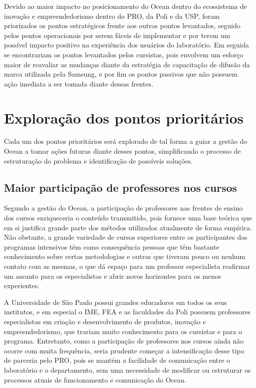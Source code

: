 Devido ao maior impacto no posicionamento do Ocean dentro do ecossistema de inovação e empreendedorismo dentro do PRO, da Poli e da USP, foram priorizados os pontos estratégicos frente aos outros pontos levantados, seguido pelos pontos operacionais por serem fáceis de implementar e por terem um possível impacto positivo na experiência dos usuários do laboratório. Em seguida se encontrariam os pontos levantados pelos cursistas, pois envolvem um esforço maior de reavaliar as mudanças diante da estratégia de capacitação de difusão da marca utilizada pela Samsung, e por fim os pontos passivos que não possuem ação imediata a ser tomada diante dessas frentes.

\section{Exploração dos pontos prioritários}

Cada um dos pontos prioritários será explorado de tal forma a guiar a gestão do Ocean a tomar ações futuras diante desses pontos, simplificando o processo de estruturação do problema e identificação de possíveis soluções.

\subsection{Maior participação de professores nos cursos}

Segundo a gestão do Ocean, a participação de professores nas frentes de ensino dos cursos enriqueceria o conteúdo transmitido, pois fornece uma base teórica que em si justifica grande parte dos métodos utilizados atualmente de forma empírica. Não obstante, a grande variedade de cursos superiores entre os participantes dos programas intensivos têm como consequência pessoas que têm bastante conhecimento sobre certas metodologias e outras que tiveram pouco ou nenhum  contato com as mesmas, o que dá espaço para um professor especialista reafirmar um assunto para os especialistas e abrir novos horizontes para os menos experientes. 

A Universidade de São Paulo possui grandes educadores em todos os seus institutos, e em especial o IME, FEA e as faculdades da Poli possuem professores especialistas em criação e desenvolvimento de produtos, inovação e empreendedorismo, que trariam muito conhecimento para os cursistas e para o programa. Entretanto, como a participação de professores nos cursos ainda não ocorre com muita frequência, seria prudente começar a intensificação desse tipo de parceria pelo PRO, pois se mantém a facilidade de comunicação entre o laboratório e o departamento, sem uma necessidade de modificar ou estruturar os processos atuais de funcionamento e comunicação do Ocean.

